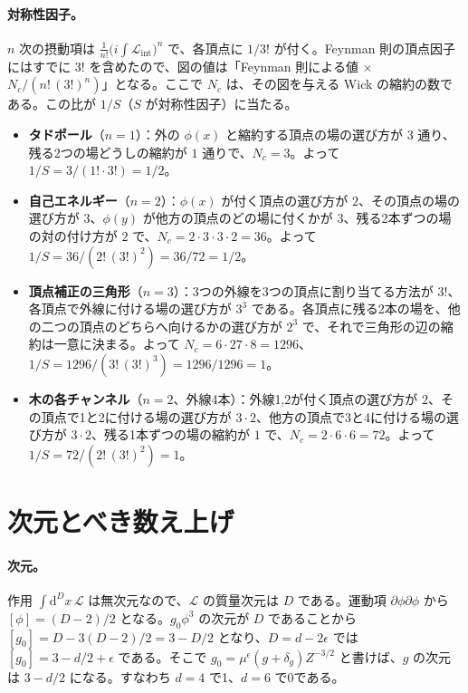 \documentclass[a4paper,10pt]{ltjsarticle}
\newcommand{\dd}{\mathrm{d}}
\begin{document}
\paragraph{対称性因子。}$n$ 次の摂動項は $\frac{1}{n!}\bigl(i\int\mathcal{L}_{\text{int}}\bigr)^n$ で、各頂点に $1/3!$ が付く。Feynman 則の頂点因子にはすでに $3!$ を含めたので、図の値は「Feynman 則による値 $\times$ $N_c/(n!\,(3!)^n)$」となる。ここで $N_c$ は、その図を与える Wick の縮約の数である。この比が $1/S$（$S$ が対称性因子）に当たる。
\begin{itemize}
\item \textbf{タドポール}（$n=1$）：外の $\phi(x)$ と縮約する頂点の場の選び方が $3$ 通り、残る2つの場どうしの縮約が $1$ 通りで、$N_c=3$。よって $1/S=3/(1!\cdot3!)=1/2$。
\item \textbf{自己エネルギー}（$n=2$）：$\phi(x)$ が付く頂点の選び方が $2$、その頂点の場の選び方が $3$、$\phi(y)$ が他方の頂点のどの場に付くかが $3$、残る2本ずつの場の対の付け方が $2$ で、$N_c=2\cdot3\cdot3\cdot2=36$。よって $1/S=36/(2!\,(3!)^2)=36/72=1/2$。
\item \textbf{頂点補正の三角形}（$n=3$）：3つの外線を3つの頂点に割り当てる方法が $3!$、各頂点で外線に付ける場の選び方が $3^3$ である。各頂点に残る2本の場を、他の二つの頂点のどちらへ向けるかの選び方が $2^3$ で、それで三角形の辺の縮約は一意に決まる。よって $N_c=6\cdot27\cdot8=1296$、$1/S=1296/(3!\,(3!)^3)=1296/1296=1$。
\item \textbf{木の各チャンネル}（$n=2$、外線4本）：外線1,2が付く頂点の選び方が $2$、その頂点で1と2に付ける場の選び方が $3\cdot2$、他方の頂点で3と4に付ける場の選び方が $3\cdot2$、残る1本ずつの場の縮約が $1$ で、$N_c=2\cdot6\cdot6=72$。よって $1/S=72/(2!\,(3!)^2)=1$。
\end{itemize}

\section{次元とべき数え上げ}\label{app:counting}

\paragraph{次元。}作用 $\int\dd^Dx\,\mathcal{L}$ は無次元なので、$\mathcal{L}$ の質量次元は $D$ である。運動項 $\partial\phi\partial\phi$ から $[\phi]=(D-2)/2$ となる。$g_0\phi^3$ の次元が $D$ であることから $[g_0]=D-3(D-2)/2=3-D/2$ となり、$D=d-2\epsilon$ では $[g_0]=3-d/2+\epsilon$ である。そこで $g_0=\mu^\epsilon(g+\delta_g)Z^{-3/2}$ と書けば、$g$ の次元は $3-d/2$ になる。すなわち $d=4$ で1、$d=6$ で0である。
\end{document}
